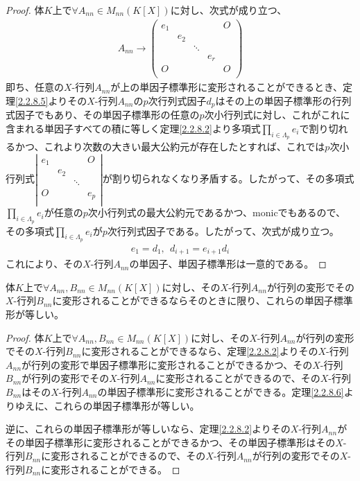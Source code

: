 \documentclass[dvipdfmx]{jsarticle}
\begin{document}
\begin{proof}
体$K$上で$\forall A_{nn} \in M_{nn}\left( K[ X] \right)$に対し、次式が成り立つ、
\begin{align*}
A_{nn} \rightarrow \begin{pmatrix}
e_{1} & \  & \  & \  & O \\
\  & e_{2} & \  & \  & \  \\
\  & \  & \ddots & \  & \  \\
\  & \  & \  & e_{r} & \  \\
O & \  & \  & \  & O \\
\end{pmatrix}
\end{align*}
即ち、任意の$X$-行列$A_{nn}$が上の単因子標準形に変形されることができるとき、定理\ref{2.2.8.5}よりその$X$-行列$A_{nn}$の$p$次行列式因子$d_{p}$はその上の単因子標準形の行列式因子でもあり、その単因子標準形の任意の$p$次小行列式に対し、これがこれに含まれる単因子すべての積に等しく定理\ref{2.2.8.2}より多項式$\prod_{i \in \varLambda_{p}} e_{i}$で割り切れるかつ、これより次数の大きい最大公約元が存在したとすれば、これでは$p$次小行列式$\left| \begin{matrix}
e_{1} & \  & \  & O \\
\  & e_{2} & \  & \  \\
\  & \  & \ddots & \  \\
O & \  & \  & e_{p} \\
\end{matrix} \right|$が割り切られなくなり矛盾する。したがって、その多項式$\prod_{i \in \varLambda_{p}} e_{i}$が任意の$p$次小行列式の最大公約元であるかつ、monicでもあるので、その多項式$\prod_{i \in \varLambda_{p}} e_{i}$が$p$次行列式因子である。したがって、次式が成り立つ。
\begin{align*}
e_{1} = d_{1},\ \ d_{i + 1} = e_{i + 1}d_{i}
\end{align*}
これにより、その$X$-行列$A_{nn}$の単因子、単因子標準形は一意的である。
\end{proof}
\begin{thm}\label{2.2.8.7}
体$K$上で$\forall A_{nn},B_{nn} \in M_{nn}\left( K[ X] \right)$に対し、その$X$-行列$A_{nn}$が行列の変形でその$X$-行列$B_{nn}$に変形されることができるならそのときに限り、これらの単因子標準形が等しい。
\end{thm}
\begin{proof}
体$K$上で$\forall A_{nn},B_{nn} \in M_{nn}\left( K[ X] \right)$に対し、その$X$-行列$A_{nn}$が行列の変形でその$X$-行列$B_{nn}$に変形されることができるなら、定理\ref{2.2.8.2}よりその$X$-行列$A_{nn}$が行列の変形で単因子標準形に変形されることができるかつ、その$X$-行列$B_{nn}$が行列の変形でその$X$-行列$A_{nn}$に変形されることができるので、その$X$-行列$B_{nn}$はその$X$-行列$A_{nn}$の単因子標準形に変形されることができる。定理\ref{2.2.8.6}よりゆえに、これらの単因子標準形が等しい。\par
逆に、これらの単因子標準形が等しいなら、定理\ref{2.2.8.2}よりその$X$-行列$A_{nn}$がその単因子標準形に変形されることができるかつ、その単因子標準形はその$X$-行列$B_{nn}$に変形されることができるので、その$X$-行列$A_{nn}$が行列の変形でその$X$-行列$B_{nn}$に変形されることができる。
\end{proof}
\end{document}
